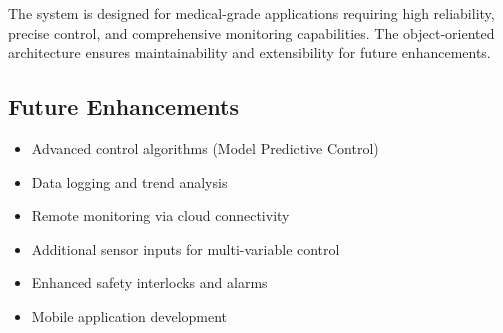 \documentclass[12pt,a4paper]{article}
\begin{document}
The system is designed for medical-grade applications requiring high reliability, precise control, and comprehensive monitoring capabilities. The object-oriented architecture ensures maintainability and extensibility for future enhancements.

\subsection{Future Enhancements}
\begin{itemize}
    \item Advanced control algorithms (Model Predictive Control)
    \item Data logging and trend analysis
    \item Remote monitoring via cloud connectivity
    \item Additional sensor inputs for multi-variable control
    \item Enhanced safety interlocks and alarms
    \item Mobile application development
\end{itemize}
\end{document}
